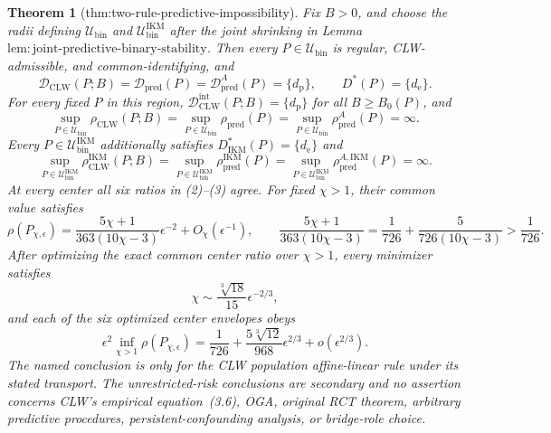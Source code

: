 \documentclass{article}
\newtheorem{theorem}{Theorem}
\begin{document}
\begin{theorem}[thm:two-rule-predictive-impossibility]\label{thm:two-rule-predictive-impossibility}
Fix \(B>0\), and choose the radii defining \(\mathcal U_{\mathrm{bin}}\) and \(\mathcal U_{\mathrm{bin}}^{\mathrm{IKM}}\) after the joint shrinking in Lemma~\(\mathrm{lem{:}joint\text{-}predictive\text{-}binary\text{-}stability}\). Then every \(P\in\mathcal U_{\mathrm{bin}}\) is regular, CLW-admissible, and common-identifying, and
\[
 \mathcal D_{\mathrm{CLW}}(P;B)
 =\mathcal D_{\mathrm{pred}}(P)
 =\mathcal D_{\mathrm{pred}}^A(P)
 =\{d_{\mathrm p}\},
 \qquad D^*(P)=\{d_{\mathrm e}\}.                         \tag{1}
\]
For every fixed \(P\) in this region, \(\mathcal D_{\mathrm{CLW}}^{\mathrm{int}}(P;B)=\{d_{\mathrm p}\}\) for all \(B\ge B_0(P)\), and
\[
 \sup_{P\in\mathcal U_{\mathrm{bin}}}\rho_{\mathrm{CLW}}(P;B)
 =\sup_{P\in\mathcal U_{\mathrm{bin}}}\rho_{\mathrm{pred}}(P)
 =\sup_{P\in\mathcal U_{\mathrm{bin}}}\rho_{\mathrm{pred}}^A(P)
 =\infty.                                                   \tag{2}
\]
Every \(P\in\mathcal U_{\mathrm{bin}}^{\mathrm{IKM}}\) additionally satisfies \(D_{\mathrm{IKM}}^*(P)=\{d_{\mathrm e}\}\) and
\[
 \sup_{P\in\mathcal U_{\mathrm{bin}}^{\mathrm{IKM}}}
 \rho_{\mathrm{CLW}}^{\mathrm{IKM}}(P;B)
 =\sup_{P\in\mathcal U_{\mathrm{bin}}^{\mathrm{IKM}}}
 \rho_{\mathrm{pred}}^{\mathrm{IKM}}(P)
 =\sup_{P\in\mathcal U_{\mathrm{bin}}^{\mathrm{IKM}}}
 \rho_{\mathrm{pred}}^{A,\mathrm{IKM}}(P)
 =\infty.                                                   \tag{3}
\]
At every center all six ratios in (2)--(3) agree. For fixed \(\chi>1\), their common value satisfies
\[
 \rho(P_{\chi,\epsilon})
 =\frac{5\chi+1}{363(10\chi-3)}\epsilon^{-2}
 +O_\chi(\epsilon^{-1}),
 \qquad
 \frac{5\chi+1}{363(10\chi-3)}
 =\frac1{726}+\frac5{726(10\chi-3)}>\frac1{726}.          \tag{4}
\]
After optimizing the exact common center ratio over \(\chi>1\), every minimizer satisfies
\[
 \chi\sim\frac{\sqrt[3]{18}}{15}\epsilon^{-2/3},         \tag{5}
\]
and each of the six optimized center envelopes obeys
\[
 \epsilon^2\inf_{\chi>1}\rho(P_{\chi,\epsilon})
 =\frac1{726}+\frac{5\sqrt[3]{12}}{968}\epsilon^{2/3}
 +o(\epsilon^{2/3}).                                       \tag{6}
\]
The named conclusion is only for the CLW population affine-linear rule under its stated transport. The unrestricted-risk conclusions are secondary and no assertion concerns CLW's empirical equation~(3.6), OGA, original RCT theorem, arbitrary predictive procedures, persistent-confounding analysis, or bridge-role choice.
\end{theorem}
\end{document}

